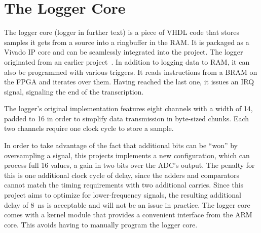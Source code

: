 %
%
\section{The Logger Core} %
\label{sec:fpga:logger}

The logger core (logger  in further text) is a piece of  VHDL code that stores
samples it gets from a source into  a ringbuffer in the RAM. It is packaged as
a  Vivado IP  core and  can be  seamlessly integrated  into the  project.  The
logger originated from an earlier project~\cite{huess-schnid}.  In addition to
logging data to RAM, it can also be programmed with various triggers. It reads
instructions from  a BRAM on the  FPGA and iterates over  them. Having reached
the last one, it issues an IRQ signal, signaling the end of the transcription.

The logger's original  implementation features eight channels with  a width of
\SI{14}{\bit}, padded to \SI{16}{\bit} in  order to simplify data transmission
in byte-sized chunks. Each two channels require one clock cycle to store
a sample.

In order to take advantage of the  fact that additional bits can be ``won'' by
oversampling a signal, this projects implements a new configuration, which can
process full \SI{16}{\bit}  values, a gain in two bits  over the ADC's output.
The penalty for this is one additional  clock cycle of delay, since the adders
and  comparators cannot  match  the timing  requirements  with two  additional
carries.  Since this project aims to optimize for lower-frequency signals, the
resulting additional delay of \SI{8}{\nano\second}  is acceptable and will not
be an  issue in  practice.  The logger  core comes with  a kernel  module that
provides  a convenient  interface from  the  ARM core. This  avoids having  to
manually program the logger core.

%
%
